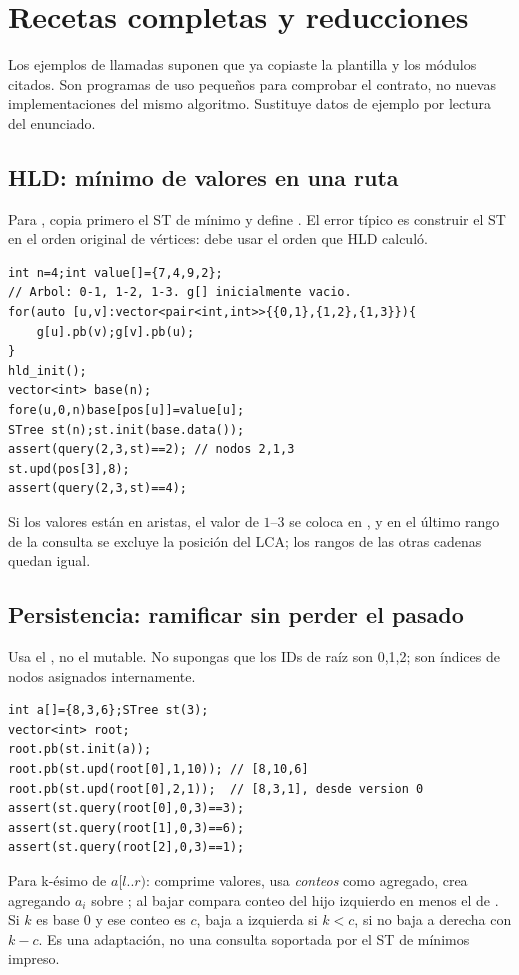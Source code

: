 \section{Recetas completas y reducciones}
Los ejemplos de llamadas suponen que ya copiaste la plantilla y los módulos citados. Son programas de uso pequeños para comprobar el contrato, no nuevas implementaciones del mismo algoritmo. Sustituye datos de ejemplo por lectura del enunciado.

\subsection{HLD: mínimo de valores en una ruta}
Para , copia primero el ST de mínimo y define . El error típico es construir el ST en el orden original de vértices: debe usar el orden  que HLD calculó.
\begin{lstlisting}
int n=4;int value[]={7,4,9,2};
// Arbol: 0-1, 1-2, 1-3. g[] inicialmente vacio.
for(auto [u,v]:vector<pair<int,int>>{{0,1},{1,2},{1,3}}){
    g[u].pb(v);g[v].pb(u);
}
hld_init();
vector<int> base(n);
fore(u,0,n)base[pos[u]]=value[u];
STree st(n);st.init(base.data());
assert(query(2,3,st)==2); // nodos 2,1,3
st.upd(pos[3],8);
assert(query(2,3,st)==4);
\end{lstlisting}
Si los valores están en aristas, el valor de $1$--$3$ se coloca en , y en el último rango de la consulta se excluye la posición del LCA; los rangos de las otras cadenas quedan igual.

\subsection{Persistencia: ramificar sin perder el pasado}
Usa el , no el mutable. No supongas que los IDs de raíz son 0,1,2; son índices de nodos asignados internamente.
\begin{lstlisting}
int a[]={8,3,6};STree st(3);
vector<int> root;
root.pb(st.init(a));
root.pb(st.upd(root[0],1,10)); // [8,10,6]
root.pb(st.upd(root[0],2,1));  // [8,3,1], desde version 0
assert(st.query(root[0],0,3)==3);
assert(st.query(root[1],0,3)==6);
assert(st.query(root[2],0,3)==1);
\end{lstlisting}
Para k-ésimo de $a[l..r)$: comprime valores, usa \emph{conteos} como agregado, crea  agregando $a_i$ sobre ; al bajar compara conteo del hijo izquierdo en  menos el de . Si $k$ es base 0 y ese conteo es $c$, baja a izquierda si $k<c$, si no baja a derecha con $k-c$. Es una adaptación, no una consulta soportada por el ST de mínimos impreso.

